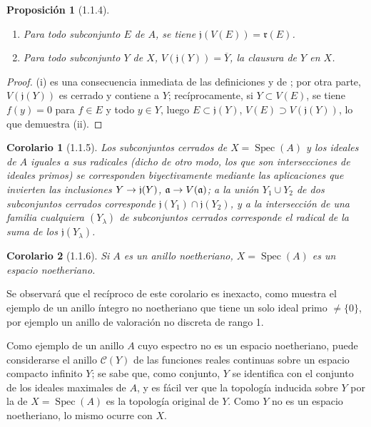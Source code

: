 \documentclass[oneside]{amsart}
\theoremstyle{ega-env-style}
\theoremstyle{ega-thm-env-style}
\newtheorem*{proposition}{Proposición}
\newtheorem*{corollary}{Corolario}
\theoremstyle{ega-defn-env-style}
\def\mathcal{\mathscr}
\renewcommand{\to}{\mathchoice{\longrightarrow}{\rightarrow}{\rightarrow}{\rightarrow}}
\let\EGAOriginalLabel\label
\renewcommand{\label}[1]{\phantomsection\EGAOriginalLabel{#1}}
\begin{document}
\begin{proposition}[1.1.4]
\label{I.1.1.4}
\medskip\noindent
\begin{enumerate}
  \item[{\rm(i)}] Para todo subconjunto $E$ de $A$, se tiene $\mathfrak{j}(V(E))=\mathfrak{r}(E)$.
  \item[{\rm(ii)}] Para todo subconjunto $Y$ de $X$, $V(\mathfrak{j}(Y))=\overline{Y}$, la clausura de $Y$ en $X$.
\end{enumerate}
\end{proposition}

\begin{proof}
(i) es una consecuencia inmediata de las definiciones y de ;
por otra parte, $V(\mathfrak{j}(Y))$ es cerrado y contiene a $Y$;
recíprocamente, si $Y\subset V(E)$, se tiene $f(y)=0$ para $f\in E$ y todo $y\in Y$, luego $E\subset\mathfrak{j}(Y)$, $V(E)\supset V(\mathfrak{j}(Y))$, lo que demuestra (ii).
\end{proof}

\begin{corollary}[1.1.5]
\label{I.1.1.5}
Los subconjuntos cerrados de $X=\operatorname{Spec}(A)$ y los ideales de $A$ iguales a sus radicales (dicho de otro modo, los que son intersecciones de ideales primos) se corresponden biyectivamente mediante las aplicaciones que invierten las inclusiones $Y\to\mathfrak{j}(Y)$, $\mathfrak{a}\to V(\mathfrak{a})$;
a la unión $Y_1\cup Y_2$ de dos subconjuntos cerrados corresponde $\mathfrak{j}(Y_1)\cap\mathfrak{j}(Y_2)$, y a la intersección de una familia cualquiera $(Y_\lambda)$ de subconjuntos cerrados corresponde el radical de la suma de los $\mathfrak{j}(Y_\lambda)$.
\end{corollary}

\begin{corollary}[1.1.6]
\label{I.1.1.6}
Si $A$ es un anillo noetheriano, $X=\operatorname{Spec}(A)$ es un espacio noetheriano.
\end{corollary}

Se observará que el recíproco de este corolario es inexacto, como muestra el ejemplo de un anillo íntegro no noetheriano que tiene un solo ideal primo $\neq\{0\}$, por ejemplo un anillo de valoración no discreta de rango 1.

Como ejemplo de un anillo $A$ cuyo espectro no es un espacio noetheriano, puede considerarse el anillo $\mathcal{C}(Y)$ de las funciones reales continuas sobre un espacio compacto infinito $Y$;
se sabe que, como conjunto, $Y$ se identifica con el conjunto de los ideales maximales de $A$, y es fácil ver que la topología inducida sobre $Y$ por la de $X=\operatorname{Spec}(A)$ es la topología original de $Y$.
Como $Y$ no es un espacio noetheriano, lo mismo ocurre con $X$.
\end{document}
